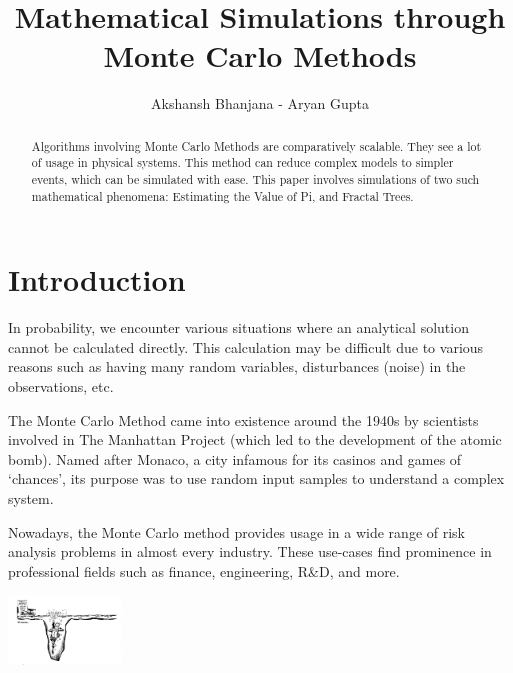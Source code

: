 \documentclass{resonance}
\begin{document}
\title{Mathematical Simulations through Monte Carlo Methods}
\author{Akshansh Bhanjana - Aryan Gupta}

\maketitle
{}

\begin{abstract}
Algorithms involving Monte Carlo Methods are comparatively scalable. They see a lot of usage in physical systems. This method can reduce complex models to simpler events, which can be simulated with ease. This paper involves simulations of two such mathematical phenomena: Estimating the Value of Pi, and Fractal Trees.
\end{abstract}



\section*{Introduction}
In probability, we encounter various situations where an analytical solution cannot be calculated directly. This calculation may be difficult due to various reasons such as having many random variables, disturbances (noise) in the observations, etc.

The Monte Carlo Method came into existence around the 1940s by scientists involved in The Manhattan Project (which led to the development of the atomic bomb). Named after Monaco, a city infamous for its casinos and games of ‘chances’, its purpose was to use random input samples to understand a complex system. 

Nowadays, the Monte Carlo method provides usage in a wide range of risk analysis problems in almost every industry. These use-cases find prominence in professional fields such as finance, engineering, R\&D, and more.

\hspace{90pt}\includegraphics[width=3cm]{the-flaw-of-averages}
\end{document}
